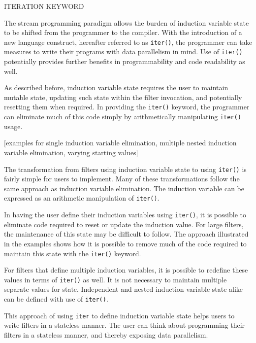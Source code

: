 {\large ITERATION KEYWORD}

The stream programming paradigm allows the burden of induction variable state to be shifted from the programmer to the compiler.  With the introduction of a new language construct, hereafter referred to as {\tt iter()}, the programmer can take measures to write their programs with data parallelism in mind.  Use of {\tt iter()} potentially provides further benefits in programmability and code readability as well.

As described before, induction variable state requires the user to maintain mutable state, updating such state within the filter invocation, and potentially resetting them when required.  In providing the {\tt iter()} keyword, the programmer can eliminate much of this code simply by arithmetically manipulating {\tt iter()} usage.  

[examples for single induction variable elimination, multiple nested induction variable elimination, varying starting values]

The transformation from filters using induction variable state to using {\tt iter()} is fairly simple for users to implement.  Many of these transformations follow the same approach as induction variable elimination.  The induction variable can be expressed as an arithmetic manipulation of {\tt iter()}.

In having the user define their induction variables using {\tt iter()}, it is possible to eliminate code required to reset or update the induction value.  For large filters, the maintenance of this state may be difficult to follow.  The approach illustrated in the examples shows how it is possible to remove much of the code required to maintain this state with the {\tt iter()} keyword.  

For filters that define multiple induction variables, it is possible to redefine these values in terms of {\tt iter()} as well.  It is not necessary to maintain multiple separate values for state.  Independent and nested induction variable state alike can be defined with use of {\tt iter()}.

This approach of using {\tt iter} to define induction variable state helps users to write filters in a stateless manner.  The user can think about programming their filters in a stateless manner, and thereby exposing data parallelism. 



